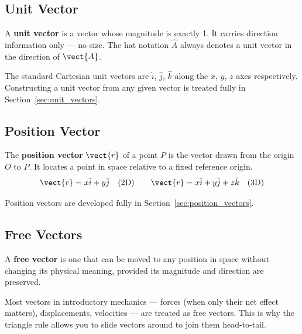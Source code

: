 \subsection*{Unit Vector}

\begin{definitionbox}
A \textbf{unit vector} is a vector whose magnitude is
exactly 1. It carries direction information only ---
no size. The hat notation $\hat{A}$ always denotes a
unit vector in the direction of $\vect{A}$.
\end{definitionbox}

\noindent The standard Cartesian unit vectors are
$\hat{i}$, $\hat{j}$, $\hat{k}$ along the $x$, $y$,
$z$ axes respectively. Constructing a unit vector from
any given vector is treated fully in
Section~\ref{sec:unit_vectors}.

\subsection*{Position Vector}

\begin{definitionbox}
The \textbf{position vector} $\vect{r}$ of a point $P$
is the vector drawn from the origin $O$ to $P$.
It locates a point in space relative to a fixed
reference origin.
\[
  \vect{r} = x\hat{i} + y\hat{j}
  \quad \text{(2D)}
  \qquad
  \vect{r} = x\hat{i} + y\hat{j} + z\hat{k}
  \quad \text{(3D)}
\]
\end{definitionbox}

\noindent Position vectors are developed fully in
Section~\ref{sec:position_vectors}.

\subsection*{Free Vectors}

\begin{definitionbox}
A \textbf{free vector} is one that can be moved to any
position in space without changing its physical meaning,
provided its magnitude and direction are preserved.
\end{definitionbox}

\noindent Most vectors in introductory mechanics ---
forces (when only their net effect matters),
displacements, velocities --- are treated as free
vectors. This is why the triangle rule allows you to
slide vectors around to join them head-to-tail.


